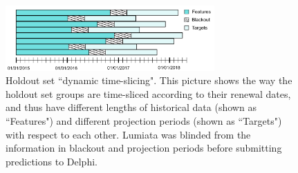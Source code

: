 \documentclass[letterpaper]{article} %
\begin{document}



\begin{figure}
 \centering
  \includegraphics[width=80mm, scale=0.4]{fig-1-slicing-holdout-logic-updated.pdf}
  \caption{Holdout set ``dynamic time-slicing".  This picture shows the way the holdout set groups are time-sliced according to their renewal dates, and thus have different lengths of historical data (shown as ``Features") and different projection periods (shown as ``Targets") with respect to each other. Lumiata was blinded from the information in blackout and projection periods before submitting predictions to Delphi.}
  \label{fig:fig1}
\end{figure}



\end{document}
